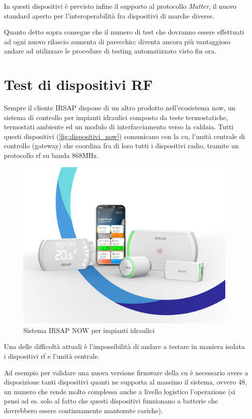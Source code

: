 \documentclass[12pt,a4paper,twoside,titlepage]{book}
\begin{document}
In questi dispositivi è previsto infine il supporto al protocollo \textit{Matter},
il nuovo standard aperto per l'interoperabilità fra dispositivi di marche diverse.

Quanto detto sopra consegue che il numero di test che dovranno essere effettuati ad
ogni nuovo rilascio aumenta di parecchio: diventa ancora più vantaggioso andare ad
utilizzare le procedure di testing automatizzato visto fin ora.

\section{Test di dispositivi RF}

Sempre il cliente IRSAP dispone di un altro prodotto nell'ecosistema \Gls{now},
un sistema di controllo per impianti idraulici composto da teste termostatiche,
termostati ambiente ed un modulo di interfacciamento verso la caldaia. Tutti questi
dispositivi (\autoref{fig:dispositivi_now}) comunicano con la \acrfull{cu}, l'unità 
centrale di controllo (\gls{gateway}) che coordina fra di loro tutti i dispositivi radio, 
tramite un protocollo \acrshort{rf} su banda 868MHz.

\begin{figure}[h]
    \centering
    \includegraphics[width=11cm]{img/now.jpeg}
    \caption{Sistema IRSAP NOW per impianti idraulici}
    \label{fig:dispositivi_now}
\end{figure}

Una delle difficoltà attuali è l'impossibilità di andare a testare in maniera isolata i
dispositivi \Gls{rf} e l'unità centrale.

Ad esempio per validare una nuova versione \gls{firmware} della \acrshort{cu} è necessario avere a disposizione tanti dispositivi quanti
ne supporta al massimo il sistema, ovvero 48, un numero che rende molto complessa anche a
livello logistico l'operazione (si pensi ad es. solo al fatto che questi dispositivi funzionano a
batterie che dovrebbero essere continuamente mantenute cariche).
\end{document}
